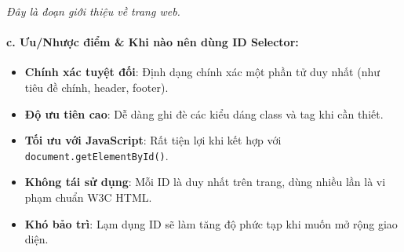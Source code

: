 \documentclass[11pt,oneside]{book}
\newcommand{\codeinline}[1]{\textcolor{accentOrange}{\texttt{#1}}}
\begin{document}
\begin{browserWindow}
\sffamily\small
{} \par\vspace{4pt}
\flushleft
\textcolor{gray!80}{\large\textit{Đây là đoạn giới thiệu về trang web.}} \par\vspace{4pt}
\end{browserWindow}

\paragraph{c. Ưu/Nhược điểm \& Khi nào nên dùng ID Selector:}

\begin{tipBox}
\begin{itemize}[leftmargin=1.5em, itemsep=2pt, parsep=0pt]
    \item \textbf{Chính xác tuyệt đối}: Định dạng chính xác một phần tử duy nhất (như tiêu đề chính, header, footer).
    \item \textbf{Độ ưu tiên cao}: Dễ dàng ghi đè các kiểu dáng class và tag khi cần thiết.
    \item \textbf{Tối ưu với JavaScript}: Rất tiện lợi khi kết hợp với \codeinline{document.getElementById()}.
\end{itemize}
\end{tipBox}

\begin{warnBox}
\begin{itemize}[leftmargin=1.5em, itemsep=2pt, parsep=0pt]
    \item \textbf{Không tái sử dụng}: Mỗi ID là duy nhất trên trang, dùng nhiều lần là vi phạm chuẩn W3C HTML.
    \item \textbf{Khó bảo trì}: Lạm dụng ID sẽ làm tăng độ phức tạp khi muốn mở rộng giao diện.
\end{itemize}
\end{warnBox}
\end{document}
